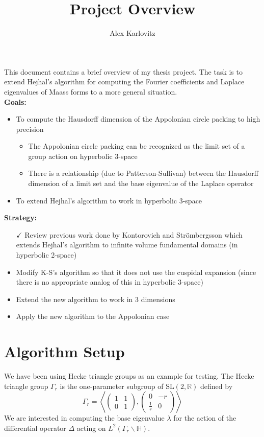 \documentclass[]{article}
\title{Project Overview}
\author{Alex Karlovitz}
\date{}
\begin{document}
	
	\maketitle
	
This document contains a brief overview of my thesis project. 
The task is to extend Hejhal's algorithm for computing the Fourier coefficients and Laplace eigenvalues of Maass forms to a more general situation.
\\

\textbf{Goals:}
\begin{itemize}
	\item To compute the Hausdorff dimension of the Appolonian circle packing to high precision
	\begin{itemize}
		\item The Appolonian circle packing can be recognized as the limit set of a group action on hyperbolic 3-space
		\item There is a relationship (due to Patterson-Sullivan) between the Hausdorff dimension of a limit set and the base eigenvalue of the Laplace operator
	\end{itemize}
	\item To extend Hejhal's algorithm to work in hyperbolic 3-space
\end{itemize}

\textbf{Strategy:}
\begin{itemize}
	\item[$\checkmark$] Review previous work done by Kontorovich and Str\"ombergsson which extends Hejhal's algorithm to infinite volume fundamental domains (in hyperbolic 2-space)
	\item Modify K-S's algorithm so that it does not use the cuspidal expansion (since there is no appropriate analog of this in hyperbolic 3-space)
	\item Extend the new algorithm to work in 3 dimensions
	\item Apply the new algorithm to the Appolonian case
\end{itemize}

\section*{Algorithm Setup}

We have been using Hecke triangle groups as an example for testing.
The Hecke triangle group $\Gamma_r$ is the one-parameter subgroup of $\text{SL}(2, \mathbb{R})$ defined by
$$
\Gamma_r = \left\langle
	\begin{pmatrix}
		1 & 1 \\
		0 & 1
	\end{pmatrix},
	\begin{pmatrix}
		0 & -r \\
		\frac{1}{r} & 0
	\end{pmatrix}
\right\rangle
$$
We are interested in computing the base eigenvalue $\lambda$ for the action of the differential operator $\Delta$ acting on $L^2(\Gamma_r\backslash\mathbb{H})$.
\end{document}
